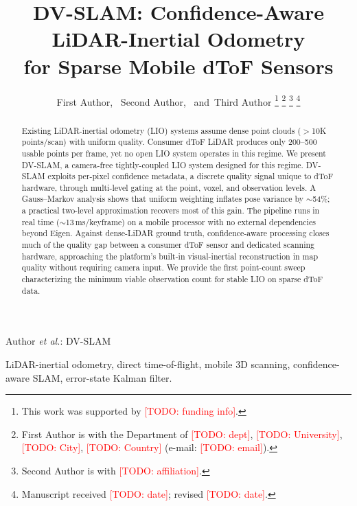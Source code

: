 \documentclass[journal]{IEEEtran}
\newcommand{\todo}[1]{\textcolor{red}{[TODO: #1]}}
\begin{document}
\title{DV-SLAM: Confidence-Aware LiDAR-Inertial Odometry\\for Sparse Mobile dToF Sensors}

\author{First Author,~
        Second Author,~
        and~Third Author%
\thanks{This work was supported by \todo{funding info}.}
\thanks{First Author is with the Department of \todo{dept}, \todo{University}, \todo{City}, \todo{Country} (e-mail: \todo{email}).}
\thanks{Second Author is with \todo{affiliation}.}
\thanks{Manuscript received \todo{date}; revised \todo{date}.}}

%
{Author \MakeLowercase{\textit{et al.}}: DV-SLAM}

\maketitle

\begin{abstract}
Existing LiDAR-inertial odometry (LIO) systems assume dense point clouds ($>$10K points/scan) with uniform quality. Consumer dToF LiDAR produces only 200--500 usable points per frame, yet no open LIO system operates in this regime. We present DV-SLAM, a camera-free tightly-coupled LIO system designed for this regime. DV-SLAM exploits per-pixel confidence metadata, a discrete quality signal unique to dToF hardware, through multi-level gating at the point, voxel, and observation levels. A Gauss--Markov analysis shows that uniform weighting inflates pose variance by ${\sim}$54\%; a practical two-level approximation recovers most of this gain. The pipeline runs in real time (${\sim}$13\,ms/keyframe) on a mobile processor with no external dependencies beyond Eigen. Against dense-LiDAR ground truth, confidence-aware processing closes much of the quality gap between a consumer dToF sensor and dedicated scanning hardware, approaching the platform's built-in visual-inertial reconstruction in map quality without requiring camera input. We provide the first point-count sweep characterizing the minimum viable observation count for stable LIO on sparse dToF data.
\end{abstract}

\begin{IEEEkeywords}
LiDAR-inertial odometry, direct time-of-flight, mobile 3D scanning, confidence-aware SLAM, error-state Kalman filter.
\end{IEEEkeywords}
\end{document}
